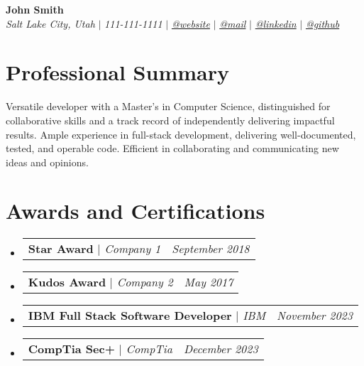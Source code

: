 \documentclass[letterpaper,10pt]{article}
\makeatletter
\newcommand{\sectionspace}{
\vspace{-20pt}
}
\newcommand{\subheadingtitlevspace}{
\vspace{-3pt}
}
\newcommand{\titleItem}[1]{
  \textbf{#1}
}
\newcommand{\resumeProjectHeading}[2]{
    \item
    \begin{tabular*}{0.97\textwidth}{l@{\extracolsep{\fill}}r}
      #1 & \textit{ #2} \\
    \end{tabular*}\vspace{-9pt}
}
\newcommand{\resumeSubHeadingListStart}{\subheadingtitlevspace\begin{itemize}[leftmargin=0.15in, label={}]}
\newcommand{\resumeSubHeadingListEnd}{\end{itemize}}
\makeatother
\begin{document}

\begin{flushleft}
	\textbf{\large John Smith} \\
	\textit{Salt Lake City, Utah} $|$
	\textit{111-111-1111} $|$
	\href{https://website}{{\textit{@website}}} $|$
	\href{mailto:email@email.com}{{\textit{@mail}}} $|$
	\href{https://linkedin.com/in/username}{{\textit{@linkedin}}} $|$
	\href{https://github.com/sansquoi}{{\textit{@github}}}
	\vspace{-8pt}
\end{flushleft}


\section{Professional Summary}
\vspace{-3pt}
\begin{itemize}[leftmargin=0.15in, label={}]
	{\item{
	      {Versatile developer with a Master's in Computer Science, distinguished for collaborative skills and a track record of independently delivering impactful results. Ample experience in full-stack development, delivering well-documented, tested, and operable code. Efficient in collaborating and communicating new ideas and opinions.} \\
	      }}
\end{itemize}
\sectionspace



\section{Awards and Certifications}
\resumeSubHeadingListStart
\resumeProjectHeading
{\titleItem{Star Award} \emph{ $|$ Company 1}}{September 2018}
\resumeProjectHeading
{\titleItem{Kudos Award} \emph{ $|$ Company 2}}{May 2017}
\resumeProjectHeading
{\titleItem{IBM Full Stack Software Developer} \emph{$|$ IBM}}{November 2023}
\resumeProjectHeading
{\titleItem{CompTia Sec+} \emph{$|$ CompTia}}{December 2023}
\resumeSubHeadingListEnd
\end{document}
